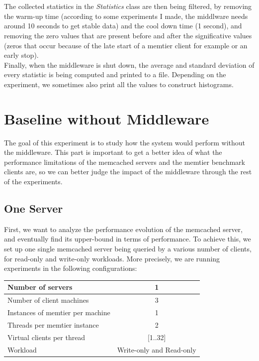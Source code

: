 \documentclass[11pt,a4paper]{article}
\begin{document}
\\\\
The collected statistics in the \textit{Statistics} class are then being filtered, by removing the warm-up time (according to some experiments I made, the middlware needs around 10 seconds to get stable data) and the cool down time (1 second), and removing the zero values that are present before and after the significative values (zeros that occur because of the late start of a memtier client for example or an early stop). 
\\
Finally, when the middleware is shut down, the average and standard deviation of every statistic is being computed and printed to a file. Depending on the experiment, we sometimes also print all the values to construct histograms.
\newpage  
\section{Baseline without Middleware}
The goal of this experiment is to study how the system would perform without the middleware. This part is important to get a better idea of what the performance limitations of the memcached servers and the memtier benchmark clients are, so we can better judge the impact of the middleware through the rest of the experiments. 

\subsection{One Server}

First, we want to analyze the performance evolution of the memcached server, and eventually find its upper-bound in terms of performance. To achieve this, we set up one single memcached server being queried by a various number of clients, for read-only and write-only workloads. More precisely, we are running experiments in the following configurations:
\begin{center}
	\scriptsize{
		\begin{tabular}{|l|c|}
			\hline Number of servers                & 1                        \\ 
			\hline Number of client machines        & 3                        \\ 
			\hline Instances of memtier per machine & 1                        \\ 
			\hline Threads per memtier instance     & 2                        \\
			\hline Virtual clients per thread       & [1..32]                  \\ 
			\hline Workload                         & Write-only and Read-only \\
			\hline 
		\end{tabular}
	} 
\end{center}
\end{document}
